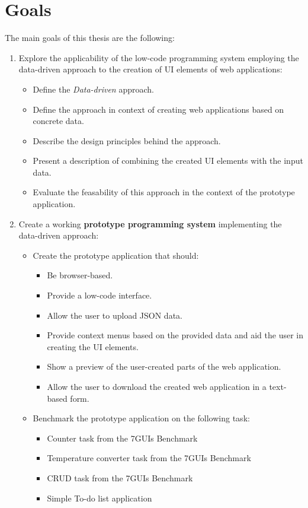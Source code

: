\section*{Goals}
The main goals of this thesis are the following:
\begin{enumerate}
	\item Explore the applicability of the low-code programming system employing the data-driven approach to the creation of UI elements of web applications:
	      \begin{itemize}
		      \item Define the \emph{Data-driven} approach.
		      \item Define the approach in context of creating web applications based on concrete data.
		      \item Describe the design principles behind the approach.
		      \item Present a description of combining the created UI elements with the input data.
		      \item Evaluate the feasability of this approach in the context of the prototype application.
	      \end{itemize}
	\item Create a working \textbf{prototype programming system} implementing the data-driven approach:
	      \begin{itemize}
		      \item Create the prototype application that should:
		            \begin{itemize}
			            \item Be browser-based.
			            \item Provide a low-code interface.
			            \item Allow the user to upload JSON data.
			            \item Provide context menus based on the provided data and aid the user in creating the UI elements.
			            \item Show a preview of the user-created parts of the web application.
			            \item Allow the user to download the created web application in a text-based form.
		            \end{itemize}

		      \item Benchmark the prototype application on the following task:
		            \begin{itemize}
			            \item Counter task from the 7GUIs Benchmark
			            \item Temperature converter task from the 7GUIs Benchmark
			            \item CRUD task from the 7GUIs Benchmark
			            \item Simple To-do list application
		            \end{itemize}

	      \end{itemize}
\end{enumerate}

